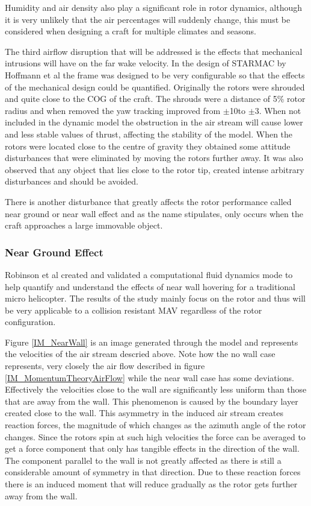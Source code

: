		Humidity and air density also play a significant role in rotor dynamics, although it is very unlikely that the air percentages will suddenly change, this must be considered when designing a craft for multiple climates and seasons.
		
		The third airflow disruption that will be addressed is the effects that mechanical intrusions will have on the far wake velocity. In the design of STARMAC by Hoffmann et al \cite{Hoffmann} the frame was designed to be very configurable so that the effects of the mechanical design could be quantified. Originally the rotors were shrouded and quite close to the COG of the craft. The shrouds were a distance of 5\% rotor radius and when removed the yaw tracking improved from $\pm$10\textdegree to $\pm$3\textdegree. When not included in the dynamic model the obstruction in the air stream will cause lower and less stable values of thrust, affecting the stability of the model. 
		When the rotors were located close to the centre of gravity they obtained some attitude disturbances that were eliminated by moving the rotors further away. It was also observed that any object that lies close to the rotor tip, created intense arbitrary disturbances and should be avoided. 
		
		There is another disturbance that greatly affects the rotor performance called near ground or near wall effect and as the name stipulates, only occurs when the craft approaches a large immovable object.
		
		\subsubsection{Near Ground Effect} \label{SSSECT_NearGroundEffect}
		Robinson et al \cite{NearWall} created and validated a computational fluid dynamics mode to help quantify and understand the effects of near wall hovering for a traditional micro helicopter. The results of the study mainly focus on the rotor and thus will be very applicable to a collision resistant MAV regardless of the rotor configuration.
		
		Figure \ref{IM_NearWall} is an image generated through the model and represents the velocities of the air stream descried above. Note how the no wall case represents, very closely the air flow described in figure \ref{IM_MomentumTheoryAirFlow} while the near wall case has some deviations. Effectively the velocities close to the wall are significantly less uniform than those that are away from the wall. This phenomenon is caused by the boundary layer created close to the wall. This asymmetry in the induced air stream creates reaction forces, the magnitude of which changes as the azimuth angle of the rotor changes. Since the rotors spin at such high velocities the force can be averaged to get a force component that only has tangible effects in the direction of the wall. The component parallel to the wall is not greatly affected as there is still a considerable amount of symmetry in that direction. Due to these reaction forces there is an induced moment that will reduce gradually as the rotor gets further away from the wall.  
		
